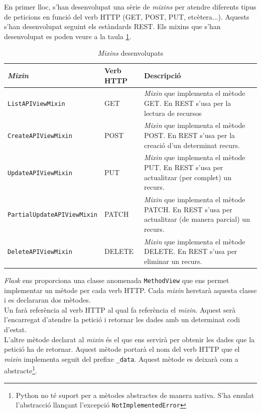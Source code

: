 En primer lloc, s'han desenvolupat una sèrie de \emph{mixins} per atendre diferents tipus de peticions en funció del verb \ac{HTTP} (GET, POST, PUT, etcètera...). Aquests s'han desenvolupat seguint els estàndards \ac{REST}. Els mixins que s'han desenvolupat es poden veure a la taula \ref{table:mixins}. 

\begin{table}[h!]
 	\begin{center}
 		\begin{tabularx}{\textwidth}{|l|l|X|}
  			\hline
 			\bfseries \emph{Mixin} & \bfseries Verb \ac{HTTP} & \bfseries Descripció \\ \hline
			\texttt{ListAPIViewMixin} &  GET & \emph{Mixin} que implementa el mètode GET. En \ac{REST} s'usa per la lectura de recursos\\ \hline
			\texttt{CreateAPIViewMixin} & POST & \emph{Mixin} que implementa el mètode POST. En \ac{REST} s'usa per la creació d'un determinat recurs.\\ \hline
			\texttt{UpdateAPIViewMixin} & PUT & \emph{Mixin} que implementa el mètode PUT. En \ac{REST} s'usa per actualitzar (per complet) un recurs.\\ \hline
			\texttt{PartialUpdateAPIViewMixin} & PATCH & \emph{Mixin} que implementa el mètode PATCH. En \ac{REST} s'usa per actualitzar (de manera parcial) un recurs.\\ \hline
			\texttt{DeleteAPIViewMixin} & DELETE  & \emph{Mixin} que implementa el mètode DELETE. En \ac{REST} s'usa per eliminar un recurs.\\ \hline
		\end{tabularx}
	\end{center}
	\caption{\emph{Mixins} desenvolupats} 
	\label{table:mixins}
\end{table}

\emph{Flask} ens proporciona una classe anomenada \texttt{MethodView} que ens permet implementar un mètode per cada verb \ac{HTTP}. Cada \emph{mixin} heretarà aquesta classe i es declararan dos mètodes. \\

Un farà referència al verb \ac{HTTP} al qual fa referència el \emph{mixin}. Aquest serà l'encarregat d'atendre la petició i retornar les dades amb un determinat codi d'estat.\\

L'altre mètode declarat al \emph{mixin} és el que ens servirà per obtenir les dades que la petició ha de retornar. Aquest mètode portarà el nom del verb \ac{HTTP} que el \emph{mixin} implementa seguit del prefixe \texttt{\_data}. Aquest mètode es deixarà com a abstracte\footnote{Python no té suport per a mètodes abstractes de manera nativa. S'ha emulat l'abstracció llançant l'excepció \texttt{NotImplementedError}}.\\

